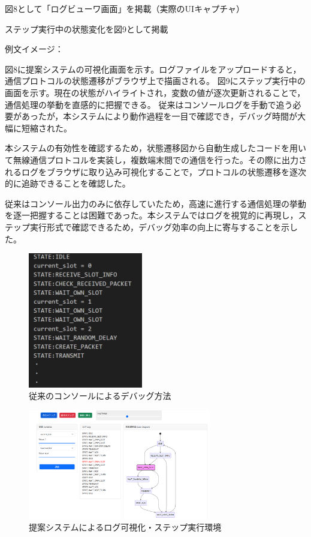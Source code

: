 \documentclass[technicalreport]{ieicej}
\begin{document}
図8として「ログビューワ画面」を掲載（実際のUIキャプチャ）

ステップ実行中の状態変化を図9として掲載

例文イメージ：

図8に提案システムの可視化画面を示す。ログファイルをアップロードすると，通信プロトコルの状態遷移がブラウザ上で描画される。
図9にステップ実行中の画面を示す。現在の状態がハイライトされ，変数の値が逐次更新されることで，通信処理の挙動を直感的に把握できる。
従来はコンソールログを手動で追う必要があったが，本システムにより動作過程を一目で確認でき，デバッグ時間が大幅に短縮された。


本システムの有効性を確認するため，状態遷移図から自動生成したコードを用いて無線通信プロトコルを実装し，複数端末間での通信を行った。その際に出力されるログをブラウザに取り込み可視化することで，プロトコルの状態遷移を逐次的に追跡できることを確認した。

従来はコンソール出力のみに依存していたため，高速に進行する通信処理の挙動を逐一把握することは困難であった。本システムではログを視覚的に再現し，ステップ実行形式で確認できるため，デバッグ効率の向上に寄与することを示した。
\begin{figure}[tb]
  \centering
  \includegraphics[width=50mm]{./images/old_debug.png}
  \caption{従来のコンソールによるデバッグ方法}
  \label{fig:old-debug}
\end{figure}
\begin{figure}[tb]
  \centering
  \includegraphics[width=80mm]{./images/step_3.png}
  \caption{提案システムによるログ可視化・ステップ実行環境}
  \label{fig:viewer-ui}
\end{figure}
\end{document}

